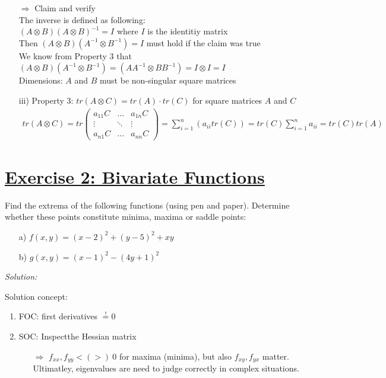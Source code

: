 \documentclass[12pt,a4paper]{article}
\newcommand{\tmpsection}[1]{}
\let\tmpsection=\section
\renewcommand{\section}[1]{\tmpsection{\underline{#1}} }
\begin{document}
\begin{itemize}
    $\Rightarrow$ Claim and verify \\
    The inverse is defined as following: \\
    $(A \otimes B)(A \otimes B)^{-1} = I$ where $I$ is the identitiy matrix\\
    Then $(A \otimes B)(A^{-1} \otimes B^{-1}) = I$ must hold if the claim was true\\
    We know from Property 3 that $(A \otimes B)(A^{-1} \otimes B^{-1}) = (AA^{-1} \otimes BB^{-1}) =  I \otimes I = I$ \\
    Dimensions: $A$ and $B$ must be non-singular square matrices
    \item[iii)] Property 3: $tr(A \otimes C ) = tr(A) \cdot tr( C)$ for square matrices $A$ and $C$
    \begin{align*}
      tr(A \otimes C) = 
      tr 
      \begin{pmatrix}
        a_{11}C & \ldots & a_{1n}C \\
        \vdots & \ddots & \vdots \\
        a_{n1}C & \ldots & a_{nn}C
      \end{pmatrix}
      = \sum_{i = 1}^{n}\left( a_{ii} tr(C) \right) = tr(C) \sum_{i=1}^{n} a_{ii} = tr(C) tr(A)
    \end{align*}
\end{itemize}

\hypertarget{exercise-2-bivariate-functions}{%
\section{Exercise 2: Bivariate
Functions}\label{exercise-2-bivariate-functions}}

Find the extrema of the following functions (using pen and paper).
Determine whether these points constitute minima, maxima or saddle
points:

\begin{itemize}
    \item[a)] $f(x,y) = (x -2)^2 + (y -5)^2 + xy$
    \item[b)] $g(x,y) = (x -1)^2 - (4y + 1)^2$
\end{itemize}

\emph{Solution:}

Solution concept:

\begin{enumerate}
    \item FOC: first derivatives $\overset{!}{=} 0$
    \item SOC: Inspectthe Hessian matrix
    \begin{itemize}
      \item[$\Rightarrow$] $f_{xx}, f_{yy} < (>) \ 0$ for maxima (minima), but also $f_{xy}, f_{yx}$ matter. Ultimatley, eigenvalues are need to judge correctly in complex situations. 
    \end{itemize}
\end{enumerate}
\end{document}
